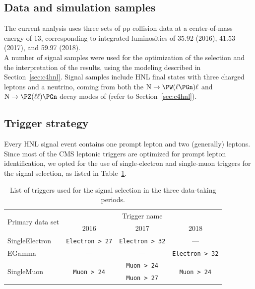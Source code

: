 \subsection{Data and simulation samples}
The current analysis uses three sets of pp collision data at a
center-of-mass energy of 13\TeV, corresponding to integrated
luminosities of 35.92 \fbinv (2016), 41.53 \fbinv (2017), and 59.97 \fbinv
(2018). \\
A number of signal samples were used for the optimization of the
selection and the interpretation of the results, using the modeling
described in Section~\ref{sec:c4hnl}.
Signal samples include HNL final states with three charged leptons and a
neutrino, coming from both the
$\hnl\to\PW(\ell\PGn)\ell$ and $\hnl\to\PZ(\ell\ell)\PGn$ decay modes
of \hnl (refer to Section~\ref{sec:c4hnl}).

\subsection{Trigger strategy}\label{sec:trigger}
Every HNL signal event contains one prompt lepton and two (generally)
\displ leptons. Since most of the CMS leptonic triggers are
optimized for prompt lepton identification,
we opted for the use of single-electron and single-muon triggers for the
signal selection, as listed in Table~\ref{tab:sgnlTriggers}.
\begin{table}[h]
{\small
  \begin{center}
    \caption{\label{tab:sgnlTriggers} List of triggers used for the
      signal selection in the three data-taking periods.}
      \begin{tabular}{|l|c|c|c|}
      \hline
      \multirow{2}{*}{Primary data set} & \multicolumn{3}{c|}{Trigger name}\\
      \cline{2-4}
      & 2016 & 2017 & 2018 \\
      \hline\hline
      SingleElectron & \texttt{\scriptsize Electron > 27} & \texttt{\scriptsize Electron > 32} & --- \\
      \hline
      EGamma         & --- & --- & \texttt{\scriptsize Electron > 32} \\
      \hline
      \multirow{2}{*}{SingleMuon} & \multirow{2}{*}{\texttt{\scriptsize Muon > 24}} & \texttt{\scriptsize Muon > 24} & \multirow{2}{*}{\texttt{\scriptsize Muon > 24}} \\
      & & \texttt{\scriptsize Muon > 27} & \\
      \hline
    \end{tabular}    
  \end{center}}
\end{table}

